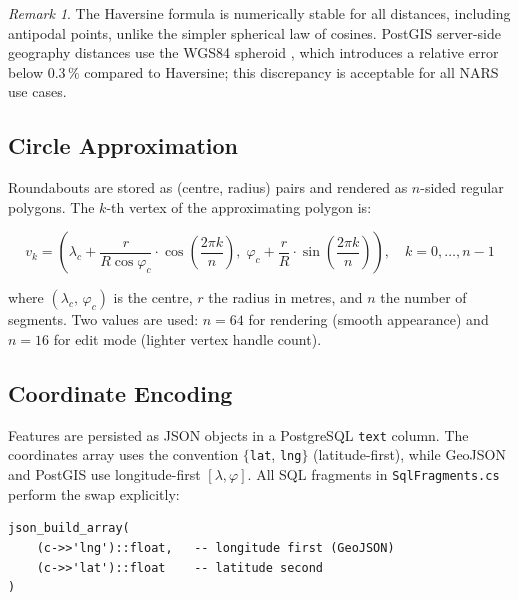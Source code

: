 \documentclass[12pt,a4paper]{article}
\theoremstyle{definition}
\theoremstyle{plain}
\theoremstyle{remark}
\newtheorem{remark}{Remark}[section]
\newcommand{\coord}[2]{(#1,\,#2)}
\begin{document}
\begin{remark}
The Haversine formula is numerically stable for all distances, including
antipodal points, unlike the simpler spherical law of cosines. PostGIS
server-side geography distances use the WGS84 spheroid \cite{postgis}, which introduces
a relative error below $0.3\,\%$ compared to Haversine; this discrepancy
is acceptable for all NARS use cases.
\end{remark}

\subsection{Circle Approximation}

Roundabouts are stored as (centre, radius) pairs and rendered as
$n$-sided regular polygons. The $k$-th vertex of the approximating polygon is:

\begin{equation}
  v_k = \left(
    \lambda_c + \frac{r}{R\cos\varphi_c} \cdot \cos\!\left(\frac{2\pi k}{n}\right),\;
    \varphi_c + \frac{r}{R} \cdot \sin\!\left(\frac{2\pi k}{n}\right)
  \right), \quad k = 0, \ldots, n-1
  \label{eq:circle_vertex}
\end{equation}

where $\coord{\lambda_c}{\varphi_c}$ is the centre, $r$ the radius in
metres, and $n$ the number of segments. Two values are used:
$n = 64$ for rendering (smooth appearance) and $n = 16$ for edit mode
(lighter vertex handle count).

\subsection{Coordinate Encoding}

Features are persisted as JSON objects in a PostgreSQL \texttt{text} column.
The coordinates array uses the convention $\{$\texttt{lat}, \texttt{lng}$\}$
(latitude-first), while GeoJSON\cite{geojson_rfc} and PostGIS use longitude-first
$[\lambda, \varphi]$. All SQL fragments in \texttt{SqlFragments.cs} perform
the swap explicitly:

\begin{lstlisting}[style=sqlstyle, caption={Coordinate-order swap in SQL fragment}]
json_build_array(
    (c->>'lng')::float,   -- longitude first (GeoJSON)
    (c->>'lat')::float    -- latitude second
)
\end{lstlisting}

\end{document}
